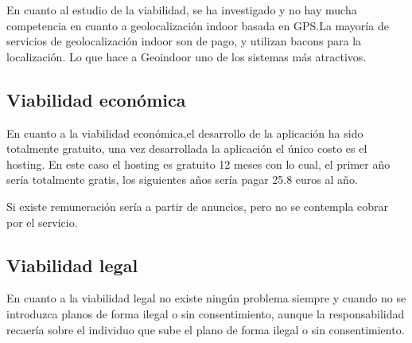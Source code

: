 En cuanto al estudio de la viabilidad, se ha investigado y no hay mucha competencia en cuanto a geolocalización indoor basada en GPS.La mayoría de servicios de geolocalización indoor son de pago, y utilizan bacons para la localización. Lo que hace a Geoindoor uno de los sistemas más atractivos.


\subsection{Viabilidad económica}

En cuanto a la viabilidad económica,el desarrollo de la aplicación ha sido totalmente gratuito, una vez desarrollada la aplicación el único costo es el hosting. En este caso el hosting es gratuito 12 meses con lo cual, el primer año sería totalmente gratis, los siguientes años sería pagar 25.8 euros al año.

Si existe remuneración sería a partir de anuncios, pero no se contempla cobrar por el servicio. 

\subsection{Viabilidad legal}

En cuanto a la viabilidad legal no existe ningún problema siempre y cuando no se introduzca planos de forma ilegal o sin consentimiento, aunque la responsabilidad recaería sobre el individuo que sube el plano de forma ilegal o sin consentimiento.
